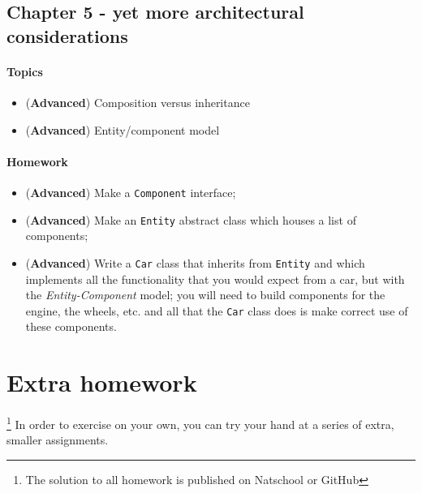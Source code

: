 		\subsection{Chapter 5 - yet more architectural considerations}
		\paragraph*{Topics}			
		\begin{itemize}
			\item (\textbf{Advanced}) Composition versus inheritance
			\item (\textbf{Advanced}) Entity/component model
		\end{itemize}
		
		\paragraph*{Homework}
		\begin{itemize}
			\item (\textbf{Advanced}) Make a \texttt{Component} interface;
			\item (\textbf{Advanced}) Make an \texttt{Entity} abstract class which houses a list of components;
			\item (\textbf{Advanced}) Write a \texttt{Car} class that inherits from \texttt{Entity} and which implements all the functionality that you would expect from a car, but with the \textit{Entity-Component} model; you will need to build components for the engine, the wheels, etc. and all that the \texttt{Car} class does is make correct use of these components.
		\end{itemize}
		
		
\section{Extra homework}\footnote{The solution to all homework is published on Natschool or GitHub}
In order to exercise on your own, you can try your hand at a series of extra, smaller assignments.

